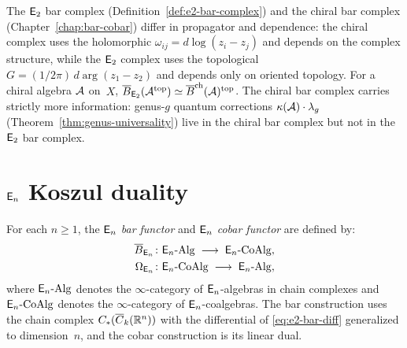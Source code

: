\begin{remark}
\label{rem:e2-vs-chiral}
The $\mathsf{E}_2$ bar complex (Definition~\ref{def:e2-bar-complex})
and the chiral bar complex (Chapter~\ref{chap:bar-cobar}) differ in propagator and dependence:
the chiral complex uses the holomorphic $\omega_{ij} = d\log(z_i - z_j)$ and depends on the complex structure,
while the $\mathsf{E}_2$ complex uses the topological $G = (1/2\pi)\, d\arg(z_1 - z_2)$ and depends only on oriented topology.
For a chiral algebra $\mathcal{A}$ on~$X$,
$\overline{B}_{\mathsf{E}_2}(\mathcal{A}^{\mathrm{top}}) \simeq \overline{B}^{\mathrm{ch}}(\mathcal{A})^{\mathrm{top}}$.
The chiral bar complex carries strictly more information: genus-$g$ quantum corrections
$\kappa(\mathcal{A}) \cdot \lambda_g$ (Theorem~\ref{thm:genus-universality})
live in the chiral bar complex but not in the $\mathsf{E}_2$ bar complex.
\end{remark}



\section{\texorpdfstring{$\mathsf{E}_n$ Koszul duality}{En Koszul duality}}
\label{sec:en-koszul-duality}

\begin{definition}
\label{def:en-bar-cobar}
For each $n \geq 1$, the \emph{$\mathsf{E}_n$ bar functor} and \emph{$\mathsf{E}_n$
cobar functor} are defined by:
\begin{align}
\overline{B}_{\mathsf{E}_n} &\colon
  \mathsf{E}_n\text{-}\mathrm{Alg} \;\longrightarrow\;
  \mathsf{E}_n\text{-}\mathrm{CoAlg},
  \label{eq:en-bar}\\
\Omega_{\mathsf{E}_n} &\colon
  \mathsf{E}_n\text{-}\mathrm{CoAlg} \;\longrightarrow\;
  \mathsf{E}_n\text{-}\mathrm{Alg},
  \label{eq:en-cobar}
\end{align}
where $\mathsf{E}_n\text{-}\mathrm{Alg}$ denotes the $\infty$-category of
$\mathsf{E}_n$-algebras in chain complexes and $\mathsf{E}_n\text{-}\mathrm{CoAlg}$
denotes the $\infty$-category of $\mathsf{E}_n$-coalgebras.  The bar
construction uses the chain complex
$C_*(\overline{C}_k(\mathbb{R}^n))$ with the differential of
\eqref{eq:e2-bar-diff} generalized to dimension~$n$, and the cobar
construction is its linear dual.
\end{definition}

